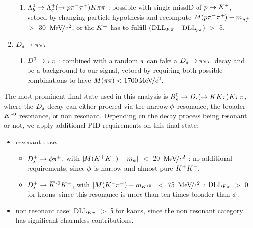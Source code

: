 \begin{enumerate}
\begin{enumerate}
\item ${{\Lambda}^0_{b}}\rightarrow{\ensuremath{{\Lambda}^+_{c}}}(\rightarrow{\ensuremath{p}}{\ensuremath{{\pi}^-}}{\ensuremath{{\pi}^+}}){K}{\pi}{\pi}$ : possible with single missID of ${p}\rightarrow{\ensuremath{{K}^+}}$, vetoed by changing particle hypothesis and recompute $M({p}{{\pi}^-}{{\pi}^+}) - m_{{{\Lambda}^+_{c}}}$ $>$ 30 ${\mathrm{\,Me\kern -0.1em V\!/}c^2}$, 
or the ${{K}^+}$ has to fulfill ($\mathrm{DLL}_{{K}{\pi}}$ - $\mathrm{DLL}_{{p}{\pi}}$) $>$ 5.

\end{enumerate}

\item ${{D}_{s}}\rightarrow{\ensuremath{\pi}}{\ensuremath{\pi}}{\ensuremath{\pi}}$

\begin{enumerate}

\item ${{D}^0}\rightarrow{\ensuremath{\pi}}{\ensuremath{\pi}}$ : combined with a random ${\pi}$ can fake a ${{D}_{s}}\rightarrow{\ensuremath{\pi}}{\ensuremath{\pi}}{\ensuremath{\pi}}$ decay and be a background to our signal, vetoed by requiring both possible combinations to have $M({\pi}{\pi}) < 1700 {\mathrm{\,Me\kern -0.1em V\!/}c^2}$.

\end{enumerate}

\end{enumerate}


The most prominent final state used in this analysis is ${{B}^0_{s}}\rightarrow{\ensuremath{{D}_{s}}}(\rightarrow{\ensuremath{K}}{\ensuremath{K}}{\ensuremath{\pi}}){K}{\pi}{\pi}$, 
where the ${{D}_{s}}$ decay can either proceed via the narrow $\phi$ resonance, the broader ${{K}^{*0}}$ resonance, or non resonant.
Depending on the decay process being resonant or not, we apply additional PID requirements on this final state:

\begin{itemize}

\item resonant case: 
\begin{itemize}
\item ${{D}^+_{s}}\rightarrow\phi{\ensuremath{{\pi}^+}}$, with $|M({{K}^+}{{K}^-}) - m_{\phi}|$ $<$ 20 ${\mathrm{\,Me\kern -0.1em V\!/}c^2}$ : no additional requirements, since $\phi$ is narrow and almost pure ${{K}^+}{{K}^-}$. 
\item ${{D}^+_{s}}\rightarrow{\ensuremath{{\kern 0.2em\overline{\kern -0.2em K}{}}{}^{*0}}}{\ensuremath{{K}^+}}$, with  $|M({{K}^-}{{\pi}^+}) -m_{{{K}^{*0}}}|$ $<$ 75 ${\mathrm{\,Me\kern -0.1em V\!/}c^2}$ :  $\mathrm{DLL}_{{K}{\pi}}$ $>$ 0 for kaons, since this resonance is more than ten times broader than $\phi$. 
\end{itemize}

\item non resonant case: $\mathrm{DLL}_{{K}{\pi}}$ $>$ 5 for kaons, since the non resonant category has significant charmless contributions.

\end{itemize}




